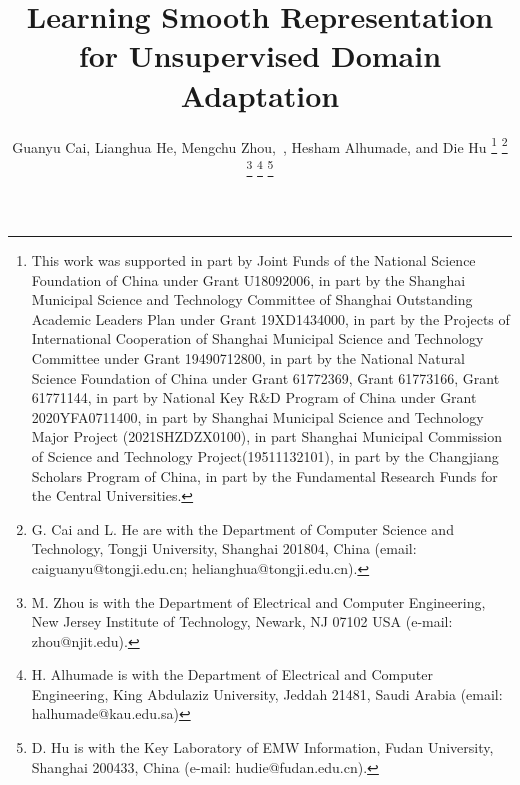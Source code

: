 \documentclass[journal,twocolumn]{IEEEtran}
\theoremstyle{definition}
\begin{document}
\title{Learning Smooth Representation for Unsupervised Domain Adaptation}


\author{Guanyu Cai,
			Lianghua He, 
			Mengchu Zhou,~,
			Hesham Alhumade,
			and Die Hu
\thanks{This work was supported in part by Joint Funds of the National Science Foundation of China under Grant U18092006, in part by the Shanghai Municipal Science and Technology Committee of Shanghai Outstanding Academic Leaders Plan under Grant 19XD1434000, in part by the Projects of International Cooperation of Shanghai Municipal Science and Technology Committee under Grant 19490712800, in part by the National Natural Science Foundation of China under Grant 61772369, Grant 61773166, Grant 61771144, in part by National Key R\&D Program of China under Grant 2020YFA0711400, in part by Shanghai Municipal Science and Technology Major Project (2021SHZDZX0100), in part Shanghai Municipal Commission of Science and Technology Project(19511132101), in part by the Changjiang Scholars Program of China, in part by the Fundamental Research Funds for the Central Universities.}
\thanks{G. Cai and L. He are with the Department of Computer Science and Technology, Tongji University, Shanghai 201804, China (email: caiguanyu@tongji.edu.cn; helianghua@tongji.edu.cn).}
\thanks{M. Zhou is with the Department of Electrical and Computer Engineering, New Jersey Institute of Technology, Newark, NJ 07102 USA (e-mail: zhou@njit.edu).}
\thanks{H. Alhumade is with the Department of Electrical and Computer Engineering, King Abdulaziz University, Jeddah 21481, Saudi Arabia (email: halhumade@kau.edu.sa)}
\thanks{D. Hu is with the Key Laboratory of EMW Information, Fudan University,
Shanghai 200433, China (e-mail: hudie@fudan.edu.cn).}
}



















\maketitle
\end{document}
